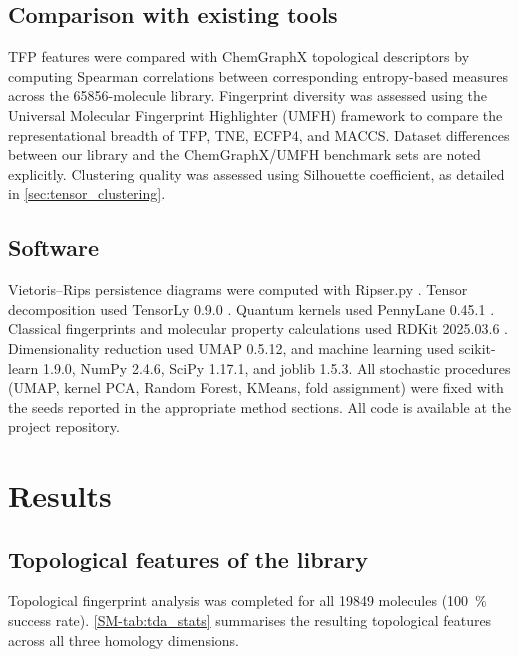 \documentclass[11pt,a4paper]{article}
\begin{document}
\subsection{Comparison with existing tools}

TFP features were compared with ChemGraphX topological descriptors \citep{chemgraphx_2026} by computing Spearman correlations between corresponding entropy-based measures across the \num{65856}-molecule library. Fingerprint diversity was assessed using the Universal Molecular Fingerprint Highlighter (UMFH) framework \citep{umfh_2026} to compare the representational breadth of TFP, TNE, ECFP4, and MACCS. Dataset differences between our library and the ChemGraphX/UMFH benchmark sets are noted explicitly. Clustering quality was assessed using Silhouette coefficient, as detailed in \cref{sec:tensor_clustering}.

\subsection{Software}

Vietoris--Rips persistence diagrams were computed with Ripser.py \citep{ripser_2019}. Tensor decomposition used TensorLy 0.9.0 \citep{tensorly_2019}. Quantum kernels used PennyLane 0.45.1 \citep{pennylane_2024}. Classical fingerprints and molecular property calculations used RDKit 2025.03.6 \citep{rdkit_2024}. Dimensionality reduction used UMAP 0.5.12, and machine learning used scikit-learn 1.9.0, NumPy 2.4.6, SciPy 1.17.1, and joblib 1.5.3. All stochastic procedures (UMAP, kernel PCA, Random Forest, KMeans, fold assignment) were fixed with the seeds reported in the appropriate method sections. All code is available at the project repository.


\section{Results}

\subsection{Topological features of the library}

Topological fingerprint analysis was completed for all \num{19849} molecules (\qty{100}{\percent} success rate). \cref{SM-tab:tda_stats} summarises the resulting topological features across all three homology dimensions.
\end{document}
